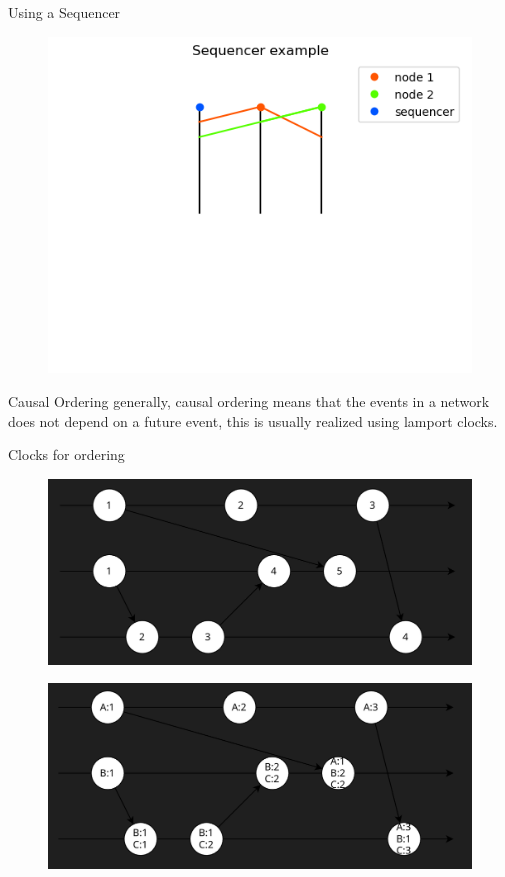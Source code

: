 \documentclass[aspectratio=1610,17pt,utf8]{beamer}
\begin{document}
\begin{frame}{Using a Sequencer}
    \begin{figure}
        \includegraphics[width=\textwidth]{figures/2-sequencer.png}
    \end{figure}
\end{frame}

\begin{frame}{Causal Ordering}
    generally, causal ordering means that the events in a network does not depend on a future event, this is usually realized using lamport clocks.


\end{frame}

\begin{frame}{Clocks for ordering}
    \begin{figure}
        \includegraphics[width=.5\textwidth]{figures/2-lamport.png}
    \end{figure}
    \begin{figure}
        \includegraphics[width=.5\textwidth]{figures/2-vector.png}
    \end{figure}
\end{frame}
\end{document}
